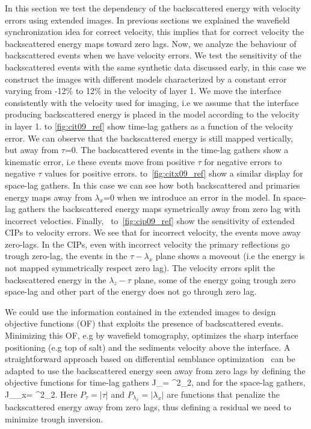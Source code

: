 In this section we test the dependency of the backscattered energy with velocity errors using extended images. In previous sections 
we explained the wavefield synchronization idea for correct velocity, this implies that for correct velocity the backscattered energy maps 
toward zero lags. Now, we analyze the behaviour of backscattered events when we have velocity errors.
We test the sensitivity of the backscattered events with the same synthetic data discussed early, in this case we construct the images
with different models characterized by a constant error varying from -12\% to 12\% in the velocity of layer 1. We move the interface 
consistently with the velocity used for imaging, i.e we assume that the interface producing backscattered energy is placed in the model
according to the velocity in layer 1.
 to \ref{fig:cit09_ref} show time-lag gathers as a function of the velocity error.
 We can observe that the backscattered energy is still mapped vertically, but
away from $\tau$=$0$. The backscattered events in the time-lag gathers show a kinematic error, i.e these events move from positive $\tau$
for negative errors to negative $\tau$ values for positive errors. 
%
 to~\ref{fig:citx09_ref} show a similar display for space-lag gathers. 
In this case we can see how both backscattered and primaries energy maps away from $\lambda_x$=$0$ when we introduce an error in the model. 
 In space-lag gathers the backscattered energy maps symetrically away from zero lag with incorrect velocties. 
%
Finally,~ to~\ref{fig:cip09_ref} show the sensitivity of extended CIPs to velocity errors. We see that for incorrect velocity, the events
move away zero-lags. In the CIPs, even with incorrect velocity the primary reflections go trough zero-lag, the events in the $\tau-\lambda_x$ plane shows a
moveout (i.e the energy is not mapped symmetrically respect zero lag). 
The velocity errors split the backscattered energy in the $\lambda_z-\tau$ plane, some of the energy going trough zero space-lag and other part
of the energy does not go through zero lag.

We could use the information contained in the extended images to design objective functions (OF) that exploits the presence of backscattered events. 
Minimizing this OF, e.g by wavefield tomography, optimizes the sharp interface positioning (e.g top of salt) and the sediments velocity above the interface.
A straightforward approach based on differential semblance optimization~\citep{shen:2132} can be adapted to use
 the backscattered energy seen away from zero lags by defining the objective functions for time-lag gathers
\beq
 J_{\tau}=  ^2_2,
\label{eq:of1}
\eeq 
and for the space-lag gathers,
\beq
 J_{\lambda_x}=  ^2_2.
\label{eq:of2}
\eeq 
%
Here $P_{\tau}=|\tau|$ and $P_{\lambda_x}=|\lambda_x|$ are functions that penalize the backscattered energy away 
from zero lags, thus defining a residual we need to minimize trough inversion.

